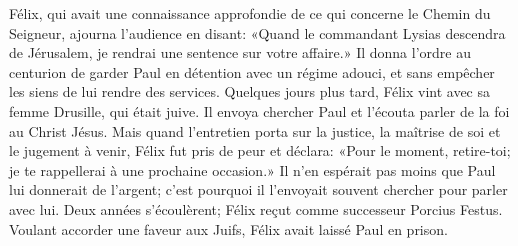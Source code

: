 Félix, qui avait une connaissance approfondie
		de ce qui concerne le Chemin du Seigneur,
	ajourna l’audience en disant:
	«Quand le commandant Lysias descendra de Jérusalem,
	je rendrai une sentence sur votre affaire.»
Il donna l’ordre au centurion de garder Paul en détention avec un régime adouci,
	et sans empêcher les siens de lui rendre des services.
Quelques jours plus tard, Félix vint avec sa femme Drusille, qui était juive.
Il envoya chercher Paul et l’écouta parler de la foi au Christ Jésus.
Mais quand l’entretien porta sur la justice,
	la maîtrise de soi et le jugement à venir,
	Félix fut pris de peur et déclara:
	«Pour le moment, retire-toi; je te rappellerai à une prochaine occasion.»
Il n’en espérait pas moins que Paul lui donnerait de l’argent;
	c’est pourquoi il l’envoyait souvent chercher pour parler avec lui.
Deux années s’écoulèrent;
	Félix reçut comme successeur Porcius Festus.
Voulant accorder une faveur aux Juifs, Félix avait laissé Paul en prison.
